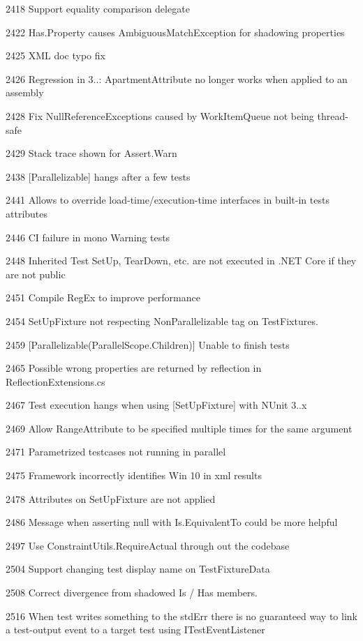 \begin{DoxyItemize}
\item 2418 Support equality comparison delegate
\item 2422 Has.\+Property causes Ambiguous\+Match\+Exception for shadowing properties
\item 2425 X\+ML doc typo fix
\item 2426 Regression in 3..\+: Apartment\+Attribute no longer works when applied to an assembly
\item 2428 Fix Null\+Reference\+Exceptions caused by Work\+Item\+Queue not being thread-\/safe
\item 2429 Stack trace shown for Assert.\+Warn
\item 2438 [Parallelizable] hangs after a few tests
\item 2441 Allows to override load-\/time/execution-\/time interfaces in built-\/in tests attributes
\item 2446 CI failure in mono Warning tests
\item 2448 Inherited Test Set\+Up, Tear\+Down, etc. are not executed in .N\+ET Core if they are not public
\item 2451 Compile Reg\+Ex to improve performance
\item 2454 Set\+Up\+Fixture not respecting Non\+Parallelizable tag on Test\+Fixtures.
\item 2459 [Parallelizable(Parallel\+Scope.\+Children)] Unable to finish tests
\item 2465 Possible wrong properties are returned by reflection in Reflection\+Extensions.\+cs
\item 2467 Test execution hangs when using [Set\+Up\+Fixture] with N\+Unit 3..\+x
\item 2469 Allow Range\+Attribute to be specified multiple times for the same argument
\item 2471 Parametrized testcases not running in parallel
\item 2475 Framework incorrectly identifies Win 10 in xml results
\item 2478 Attributes on Set\+Up\+Fixture are not applied
\item 2486 Message when asserting null with Is.\+Equivalent\+To could be more helpful
\item 2497 Use Constraint\+Utils.\+Require\+Actual through out the codebase
\item 2504 Support changing test display name on Test\+Fixture\+Data
\item 2508 Correct divergence from shadowed Is / Has members.
\item 2516 When test writes something to the std\+Err there is no guaranteed way to link a test-\/output event to a target test using I\+Test\+Event\+Listener

\end{DoxyItemize}
